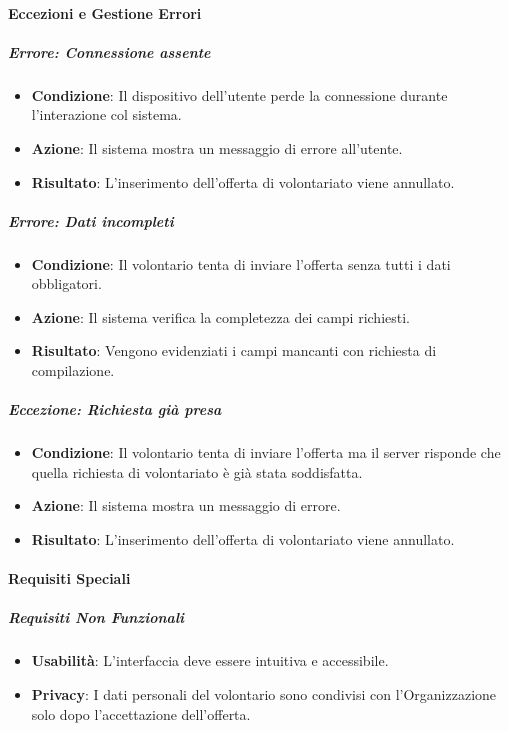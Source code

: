 \paragraph{Eccezioni e Gestione Errori}

\subparagraph*{Errore: Connessione assente}
\begin{itemize}
    \item \textbf{Condizione}: Il dispositivo dell'utente perde la connessione durante l'interazione col sistema.
    \item \textbf{Azione}: Il sistema mostra un messaggio di errore all’utente.
    \item \textbf{Risultato}: L’inserimento dell’offerta di volontariato viene annullato.
\end{itemize}

\subparagraph*{Errore: Dati incompleti}
\begin{itemize}
    \item \textbf{Condizione}: Il volontario tenta di inviare l'offerta senza tutti i dati obbligatori.
    \item \textbf{Azione}: Il sistema verifica la completezza dei campi richiesti.
    \item \textbf{Risultato}: Vengono evidenziati i campi mancanti con richiesta di compilazione.
\end{itemize}

\subparagraph*{Eccezione: Richiesta già presa}
\begin{itemize}
    \item \textbf{Condizione}: Il volontario tenta di inviare l'offerta ma il server risponde che quella richiesta di volontariato è già stata soddisfatta.
    \item \textbf{Azione}: Il sistema mostra un messaggio di errore.
    \item \textbf{Risultato}: L’inserimento dell’offerta di volontariato viene annullato.
\end{itemize}

\paragraph{Requisiti Speciali}

\subparagraph*{Requisiti Non Funzionali}

\begin{itemize}
    \item \textbf{Usabilità}: L'interfaccia deve essere intuitiva e accessibile.
    \item \textbf{Privacy}: I dati personali del volontario sono condivisi con l'Organizzazione solo dopo l'accettazione dell'offerta.
\end{itemize}

